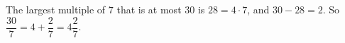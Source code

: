 The largest multiple of $7$ that is at most $30$ is $28=4\cdot7$, and $30-28=2$. So $\dfrac{30}{7}=4+\dfrac27=\boxed{4\dfrac27}$.
